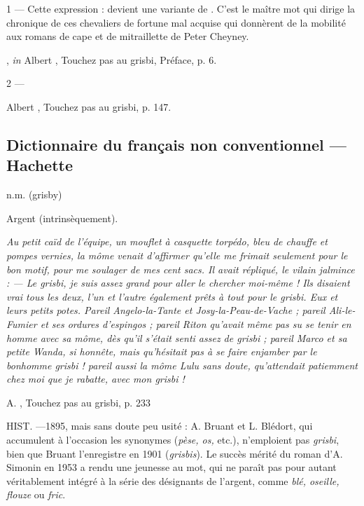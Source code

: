 1 --- Cette expression :  devient une variante de . C'est le maître mot qui dirige la chronique de ces chevaliers de fortune mal acquise qui donnèrent de la mobilité aux romans de cape et de mitraillette de Peter Cheyney.

			, \emph{in} Albert , Touchez pas au grisbi, Préface, p. 6.

2 --- 

			Albert , Touchez pas au grisbi, p. 147.


\subsection*{Dictionnaire du français non conventionnel --- Hachette}

n.m. (grisby)

Argent (intrinsèquement).

\emph{Au petit caïd de l'équipe, un mouflet à casquette torpédo, bleu de
chauffe et pompes vernies, la môme venait d'affirmer qu'elle me frimait
seulement pour le bon motif, pour me soulager de mes cent sacs. Il avait
répliqué, le vilain jalmince :
--- Le \emph{grisbi}, je suis assez grand pour aller le chercher moi-même !
Ils disaient vrai tous les deux, l'un et l'autre également prêts à tout pour le
\emph{grisbi}. Eux et leurs petits potes. Pareil Angelo-la-Tante et
Josy-la-Peau-de-Vache ; pareil Ali-le-Fumier et ses ordures d'espingos ;
pareil Riton qu'avait même pas su se tenir en homme avec sa môme, dès qu'il
s'était senti assez de \emph{grisbi} ; pareil Marco et sa petite Wanda, si
honnête, mais qu'hésitait pas à se faire enjamber par le bonhomme \emph{grisbi} ! pareil aussi la môme Lulu sans doute, qu'attendait patiemment chez moi que je rabatte, avec mon \emph{grisbi} !}

			A. , Touchez pas au grisbi, p. 233

HIST. ---1895, mais sans doute peu usité : A. Bruant et L. Blédort, qui
accumulent à l'occasion les synonymes (\emph{pèse, os,} etc.), n'emploient pas \emph{grisbi}, bien que Bruant l'enregistre en 1901 (\emph{grisbis}). Le succès mérité du roman d'A. Simonin en 1953 a rendu une jeunesse au mot, qui ne paraît pas pour autant véritablement intégré à la série des désignants de l'argent, comme \emph{blé, oseille, flouze} ou \emph{fric}.

